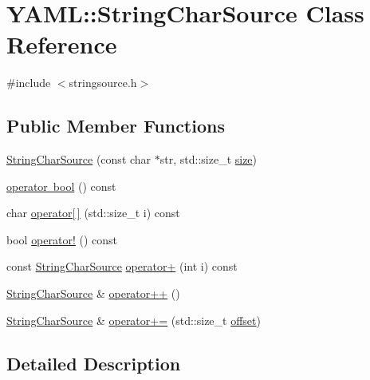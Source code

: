 \hypertarget{class_y_a_m_l_1_1_string_char_source}{}\section{Y\+A\+ML\+::String\+Char\+Source Class Reference}
\label{class_y_a_m_l_1_1_string_char_source}


{\ttfamily \#include $<$stringsource.\+h$>$}

\subsection*{Public Member Functions}
\begin{DoxyCompactItemize}
\item 
\mbox{\hyperlink{class_y_a_m_l_1_1_string_char_source_a6af978ba0ac95df336bcd017b2be10a2}{String\+Char\+Source}} (const char $\ast$str, std\+::size\+\_\+t \mbox{\hyperlink{glad_8h_a79ef9eb3e59c4bb34c4b9fbeb8d28ff7}{size}})
\item 
\mbox{\hyperlink{class_y_a_m_l_1_1_string_char_source_af34e46ac69934f0848916f145c7e097d}{operator bool}} () const
\item 
char \mbox{\hyperlink{class_y_a_m_l_1_1_string_char_source_a6d01c00ab4757c64a7bc71f6183e3523}{operator\mbox{[}$\,$\mbox{]}}} (std\+::size\+\_\+t i) const
\item 
bool \mbox{\hyperlink{class_y_a_m_l_1_1_string_char_source_aa0fb3acf86a734c0a0de0759a47398c6}{operator!}} () const
\item 
const \mbox{\hyperlink{class_y_a_m_l_1_1_string_char_source}{String\+Char\+Source}} \mbox{\hyperlink{class_y_a_m_l_1_1_string_char_source_a5e5ff972b0bb13ff47a5213b284e1a16}{operator+}} (int i) const
\item 
\mbox{\hyperlink{class_y_a_m_l_1_1_string_char_source}{String\+Char\+Source}} \& \mbox{\hyperlink{class_y_a_m_l_1_1_string_char_source_afd812171da46914f8c202340b93476d1}{operator++}} ()
\item 
\mbox{\hyperlink{class_y_a_m_l_1_1_string_char_source}{String\+Char\+Source}} \& \mbox{\hyperlink{class_y_a_m_l_1_1_string_char_source_a32db8dce449a7b95d27a338036c9ad5a}{operator+=}} (std\+::size\+\_\+t \mbox{\hyperlink{glad_8h_ae1b92ae085ddef4b1cdca7d749339fb0}{offset}})
\end{DoxyCompactItemize}


\subsection{Detailed Description}


